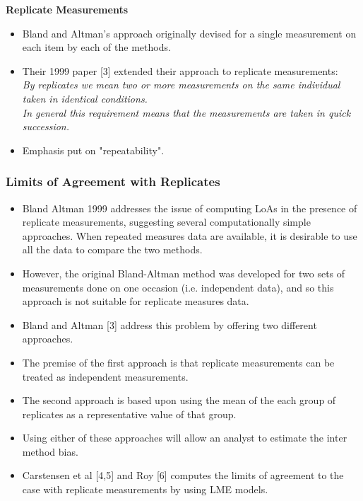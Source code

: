 \documentclass[compress]{beamer}        %
\makeatletter
\newcommand{\tcb}{\textcolor{beamer@blendedblue}}
\makeatother
\begin{document}
\begin{frame}{\bf \tcb{Replicate Measurements}}
\begin{itemize}\itemsep0.7cm
\item Bland and Altman's approach originally devised for a single measurement on each item by each of the methods.
\item Their 1999 paper [3] extended their approach to replicate measurements:\\ \emph{By replicates we mean two or more measurements on the same
individual taken in identical conditions. \\In general this requirement means that the
measurements are taken in quick succession. }
\item Emphasis put on "repeatability".
\end{itemize}
\end{frame}
\begin{frame}
\frametitle{Limits of Agreement with Replicates}
\begin{itemize}
\item Bland Altman 1999 addresses the issue of computing LoAs in the presence of replicate measurements, suggesting several computationally simple approaches. When repeated measures data are available, it is desirable to use
all the data to compare the two methods. 
\item However, the original Bland-Altman method was developed for two sets of measurements done on one occasion (i.e. independent data), and so this approach is not suitable for replicate measures data. 
\item Bland and Altman [3] address this problem by offering two different
approaches. 
\end{itemize}
\end{frame}

\begin{frame}
\begin{itemize}

\item The premise of the first approach is that replicate
measurements can be treated as independent measurements. 
\item The
second approach is based upon using the mean of the each group of
replicates as a representative value of that group. 
\item Using either
of these approaches will allow an analyst to estimate the inter
method bias.

\item Carstensen et al [4,5] and Roy [6] computes the limits of agreement to the case with replicate measurements by using LME models.
\end{itemize}
\end{frame}
\end{document}
